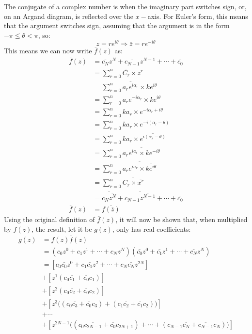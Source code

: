 \documentclass{article}
\begin{document}
The conjugate of a complex number is when the imaginary part switches sign, or, on an Argand diagram, is reflected over the \(x-\)axis. For Euler's form, this means that the argument switches sign, assuming that the argument is in the form \(-\pi \leq \theta < \pi\), so:
\[z = re^{i\theta} \Rightarrow \overline{z} = re^{-i\theta}\]
This means we can now write \(\overline{f}(z)\) as:
\begin{align*}
    \overline{f}(z) &= \overline{c_{N}}z^{N} + \overline{c_{N-1}}z^{N-1} + \cdots + \overline{c_0} \\
    &= \sum_{r=0}^{n} \overline{C_r} \times z^r \\
    &= \sum_{r=0}^{n} \overline{a_re^{i\alpha_r}} \times ke^{i\theta} \\
    &= \sum_{r=0}^{n} a_re^{-i\alpha_r} \times ke^{i\theta} \\
    &= \sum_{r=0}^{n} ka_r\times e^{-i\alpha_r+i\theta} \\
    &= \sum_{r=0}^{n} ka_r\times e^{-i(\alpha_r-\theta)} \\
    &= \sum_{r=0}^{n} ka_r\times \overline{e^{i(\alpha_r-\theta)}} \\
    &= \sum_{r=0}^n \overline{a_re^{ia_r}\times ke^{-i\theta}} \\
    &= \sum_{r=0}^n \overline{a_re^{ia_r}\times \overline{ke^{i\theta}}} \\
    &= \sum_{r=0}^{n} \overline{C_r \times \overline{x^r}} \\
    &= \overline{c_N\overline{z^N}} + \overline{c_{N-1}\overline{z^{N-1}}} + \cdots + \overline{c_0} \\
    \overline{f}(z) &= \overline{f(\overline{z})}
\end{align*}
Using the original definition of \(\overline{f}(z)\), it will now be shown that, when multiplied by \(f(z)\), the result, let it be \(g(z)\), only has real coefficients:
\begin{align}
    g(z) &= f(z)\overline{f}(z) \nonumber\\
    &= (c_0z^0 + c_1z^1 + \cdots + c_Nz^N)(\overline{c_0}z^0 + \overline{c_1}z^1 + \cdots + \overline{c_N}z^N) \nonumber\\
    &= [c_0\overline{c_0}z^0 + c_1\overline{c_1}z^2 + \cdots + c_N\overline{c_N}z^{2N}] \label{conjugates} \\
    &+ [z^1(c_0\overline{c_1} + \overline{c_0}c_1)] \label{z^1} \\
    &+ [z^2(c_0\overline{c_2} + \overline{c_0}c_2)] \label{z^2} \\
    &+ [z^3\big((c_0\overline{c_3} + \overline{c_0}c_3) + (c_1\overline{c_2} + \overline{c_1}c_2)\big)] \label{z^3} \\
    &+ \cdots \nonumber \\
    &+ [z^{2N-1}\big((c_0\overline{c_{2N-1}} + \overline{c_0}c_{2N+1}) + \cdots + (c_{N-1}\overline{c_{N}} + \overline{c_{N-1}}c_N)\big)] \label{z^2n-1}
\end{align}
\end{document}
